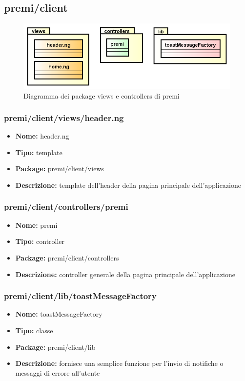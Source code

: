 \subsection{premi/client}
\begin{figure}[H]
\begin{center}
\includegraphics[scale=0.45]{img/diapkg/client.png}
\caption{Diagramma dei package views e controllers di premi}
\end{center}
\end{figure}

\subsubsection{premi/client/views/header.ng}
\begin{itemize}
  \item[] \textbf{Nome:} header.ng
  \item[] \textbf{Tipo:} template
  \item[] \textbf{Package:} premi/client/views
  \item[] \textbf{Descrizione:} template dell'header della pagina principale dell'applicazione
\end{itemize}

\subsubsection{premi/client/controllers/premi}
\begin{itemize}
  \item[] \textbf{Nome:} premi
  \item[] \textbf{Tipo:} controller
  \item[] \textbf{Package:} premi/client/controllers
  \item[] \textbf{Descrizione:} controller generale della pagina principale dell'applicazione
\end{itemize}

\subsubsection{premi/client/lib/toastMessageFactory}
\begin{itemize}
  \item[] \textbf{Nome:} toastMessageFactory
  \item[] \textbf{Tipo:} classe
  \item[] \textbf{Package:} premi/client/lib
  \item[] \textbf{Descrizione:} fornisce una semplice funzione per l'invio di notifiche o messaggi di errore all'utente
\end{itemize}

